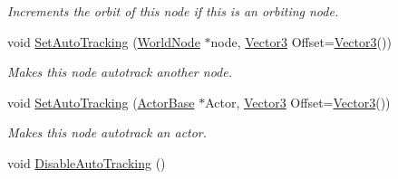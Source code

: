\begin{DoxyCompactItemize}
\begin{DoxyCompactList}\small\item\em Increments the orbit of this node if this is an orbiting node. \item\end{DoxyCompactList}\item 
void \hyperlink{classphys_1_1WorldNode_a3c8447cd6de0af06a6004cdd968671f0}{SetAutoTracking} (\hyperlink{classphys_1_1WorldNode}{WorldNode} $\ast$node, \hyperlink{classphys_1_1Vector3}{Vector3} Offset=\hyperlink{classphys_1_1Vector3}{Vector3}())
\begin{DoxyCompactList}\small\item\em Makes this node autotrack another node. \item\end{DoxyCompactList}\item 
void \hyperlink{classphys_1_1WorldNode_a3bd06b9d4a4baa6937a8a3a33a33b047}{SetAutoTracking} (\hyperlink{classphys_1_1ActorBase}{ActorBase} $\ast$Actor, \hyperlink{classphys_1_1Vector3}{Vector3} Offset=\hyperlink{classphys_1_1Vector3}{Vector3}())
\begin{DoxyCompactList}\small\item\em Makes this node autotrack an actor. \item\end{DoxyCompactList}\item 
\hypertarget{classphys_1_1WorldNode_aec20d9b24a8de76a227307a9d287d127}{
void \hyperlink{classphys_1_1WorldNode_aec20d9b24a8de76a227307a9d287d127}{DisableAutoTracking} ()}
\label{d2/d3e/classphys_1_1WorldNode_aec20d9b24a8de76a227307a9d287d127}


\end{DoxyCompactItemize}
